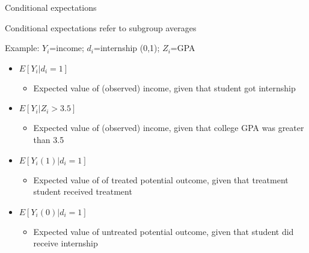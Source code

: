 \begin{frame}{Conditional expectations}

	Conditional expectations refer to subgroup averages \\
	\vspace{3mm}
	
	Example: $Y_i$=income; $d_i$=internship (0,1); $Z_i$=GPA	
	\begin{itemize}

		\item $ E[Y_i|d_i=1]$
		\begin{itemize}
			\item Expected value of (observed) income, given that student got internship
		\end{itemize}		 
		\item $ E[Y_i|Z_i >3.5]$
		\begin{itemize}
			\item Expected value of (observed) income, given that college GPA was greater than 3.5
		\end{itemize}
		\item $ E[Y_i(1)|d_i=1]$
		\begin{itemize}
			\item Expected value of of treated potential outcome, given that treatment student received treatment
		\end{itemize}		
		\item $ E[Y_i(0)|d_i=1]$
		\begin{itemize}
			\item Expected value of untreated potential outcome, given that student did receive internship
		\end{itemize}
	\end{itemize}

\end{frame}

